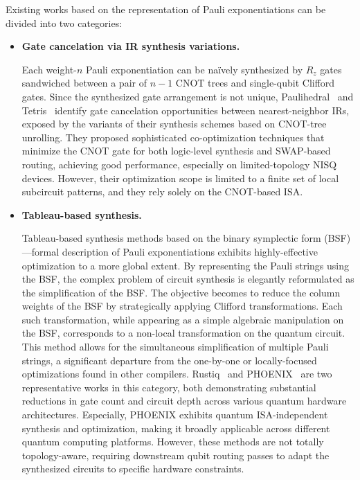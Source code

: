 \documentclass[a4paper,onecolumn,11pt,unpublished]{quantumarticle}
\begin{document}
Existing works based on the representation of Pauli exponentiations can be divided into two categories:
\begin{itemize}
  \item \textbf{Gate cancelation via IR synthesis variations.}

  Each weight-$n$ Pauli exponentiation can be na\"ively synthesized by $R_z$ gates sandwiched between a pair of $n-1$ CNOT trees and single-qubit Clifford gates. Since the synthesized gate arrangement is not unique, Paulihedral~\cite{li2022paulihedral} and Tetris~\cite{jin2024tetris} identify gate cancelation opportunities between nearest-neighbor IRs, exposed by the variants of their synthesis schemes based on CNOT-tree unrolling. They proposed sophisticated co-optimization techniques that minimize the CNOT gate for both logic-level synthesis and SWAP-based routing, achieving good performance, especially on limited-topology NISQ devices. However, their optimization scope is limited to a finite set of local subcircuit patterns, and they rely solely on the CNOT-based ISA.

  \item \textbf{Tableau-based synthesis.}

  Tableau-based synthesis methods based on the binary symplectic form (BSF)---formal description of Pauli exponentiations exhibits highly-effective optimization to a more global extent. By representing the Pauli strings using the BSF, the complex problem of circuit synthesis is elegantly reformulated as the simplification of the BSF. The objective becomes to reduce the column weights of the BSF by strategically applying Clifford transformations. Each such transformation, while appearing as a simple algebraic manipulation on the BSF, corresponds to a non-local transformation on the quantum circuit. This method allows for the simultaneous simplification of multiple Pauli strings, a significant departure from the one-by-one or locally-focused optimizations found in other compilers. Rustiq~\cite{goubaultdebrugiere2024faster} and PHOENIX~\cite{yang2025phoenix} are two representative works in this category, both demonstrating substantial reductions in gate count and circuit depth across various quantum hardware architectures. Especially, PHOENIX exhibits quantum ISA-independent synthesis and optimization, making it broadly applicable across different quantum computing platforms. However, these methods are not totally topology-aware, requiring downstream qubit routing passes to adapt the synthesized circuits to specific hardware constraints.

\end{itemize}
\end{document}
